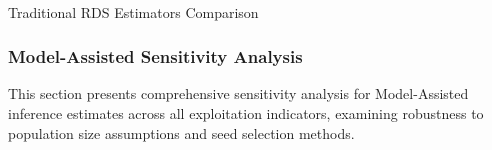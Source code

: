 \documentclass[
  12pt,
  letterpaper,
  DIV=11,
  numbers=noendperiod]{scrartcl}
\makeatletter
\let\oldparagraph\paragraph
\renewcommand{\paragraph}{
    \@ifstar
      \xxxParagraphStar
      \xxxParagraphNoStar
  }
\newcommand{\xxxParagraphStar}[1]{\oldparagraph*{#1}\mbox{}}
\newcommand{\xxxParagraphNoStar}[1]{\oldparagraph{#1}\mbox{}}
\theoremstyle{plain}
\theoremstyle{definition}
\makeatother
\begin{document}
\begin{table}
{}

\end{table}%

\paragraph{Traditional RDS Estimators
Comparison}\label{traditional-rds-estimators-comparison}

\begin{table}

\caption{\label{tbl-rds-comparison}RDS Estimator Comparison for Binary
Indicators. Source: Authors' Own Work.}


\end{table}%

\subsubsection{Model-Assisted Sensitivity
Analysis}\label{model-assisted-sensitivity-analysis}

This section presents comprehensive sensitivity analysis for
Model-Assisted inference estimates across all exploitation indicators,
examining robustness to population size assumptions and seed selection
methods.
\end{document}
